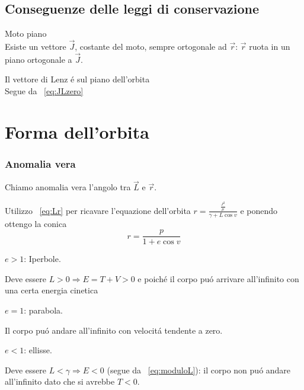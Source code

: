 \subsection{Conseguenze delle leggi di conservazione}

\begin{enumerate*}
\item Moto piano\\
Esiste un vettore $\vec{J}$, costante del moto, sempre ortogonale ad $\vec{r}$: $\vec{r}$ ruota in un piano ortogonale a $\vec{J}$.
\item Il vettore di Lenz \'e sul piano dell'orbita\\
Segue da ~\ref{eq:JLzero}
\end{enumerate*}


\section{Forma dell'orbita}


\subsubsection{Anomalia vera}

Chiamo anomalia vera l'angolo tra $\vec{L}$ e $\vec{r}$.

Utilizzo ~\ref{eq:Lr} per ricavare l'equazione dell'orbita $r=\frac{\frac{J^2}{\mu}}{\gamma+L\cos{v}}$ e ponendo  ottengo la conica
\begin{equation*}\label{eq:orbitaconica}
r=\frac{p}{1+e\cos{v}}
\end{equation*}

\begin{itemize*}
\item $e>1$: Iperbole.

Deve essere $L>0\Rightarrow E=T+V>0$ e poich\'e  il corpo pu\'o arrivare all'infinito con una certa energia cinetica

\item $e=1$: parabola.

Il corpo pu\'o andare all'infinito con velocit\'a tendente a zero.

\item $e<1$: ellisse.

Deve essere $L<\gamma\Rightarrow E<0$ (segue da ~\ref{eq:moduloL}): il corpo non pu\'o andare all'infinito dato che si avrebbe $T<0$.

\end{itemize*}

